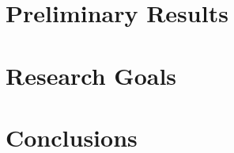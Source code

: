 \documentclass[12pt]{article}
\newcommand{\refdir}{../dissertation}
\begin{document}
\section{Preliminary Results\label{sec:results}}

\section{Research Goals\label{sec:goals}}

\section{Conclusions\label{sec:conclusions}}




\end{document}
